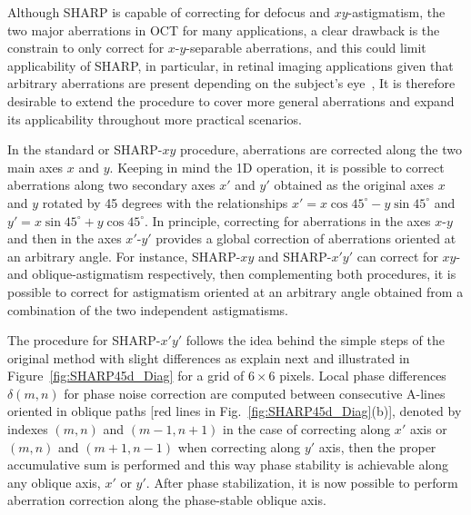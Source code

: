Although SHARP is capable of correcting for defocus and $xy$-astigmatism, the two major aberrations in OCT for many applications, a clear drawback is the constrain to only correct for $x$-$y$-separable aberrations, and this could limit applicability of SHARP, in particular, in retinal imaging applications given that arbitrary aberrations are present depending on the subject's eye~\cite{Kumar2017_Invivo, Ginner2018_Holographic, Hillmann2016_Aberrationfree}, It is therefore desirable to extend the procedure to cover more general aberrations and expand its applicability throughout more practical scenarios.

In the standard or SHARP-$xy$ procedure, aberrations are corrected along the two main axes $x$ and $y$. Keeping in mind the 1D operation, it is possible to correct aberrations along two secondary axes $x'$ and $y'$ obtained as the original axes $x$ and $y$ rotated by 45 degrees with the relationships $x'=x\cos45^\circ - y\sin45^\circ$ and $y' = x\sin45^\circ + y\cos45^\circ$. In principle, correcting for aberrations in the axes $x$-$y$ and then in the axes $x'$-$y'$ provides a global correction of aberrations oriented at an arbitrary angle. For instance, SHARP-$xy$ and SHARP-$x'y'$ can correct for $xy$- and oblique-astigmatism respectively, then complementing both procedures, it is possible to correct for astigmatism oriented at an arbitrary angle obtained from a combination of the two independent astigmatisms. 

The procedure for SHARP-$x'y'$ follows the idea behind the simple steps of the original method with slight differences as explain next and illustrated in Figure~\ref{fig:SHARP45d_Diag} for a grid of $6\times 6$ pixels. Local phase differences $\delta(m,n)$ for phase noise correction are computed between consecutive A-lines oriented in oblique paths [red lines in Fig.~\ref{fig:SHARP45d_Diag}(b)], denoted by indexes $(m,n)$ and $(m-1, n+1)$ in the case of correcting along $x'$ axis or $(m,n)$ and $(m+1, n-1)$ when correcting along $y'$ axis, then the proper accumulative sum is performed and this way phase stability is achievable along any oblique axis, $x'$ or $y'$. After phase stabilization, it is now possible to perform aberration correction along the phase-stable oblique axis.

